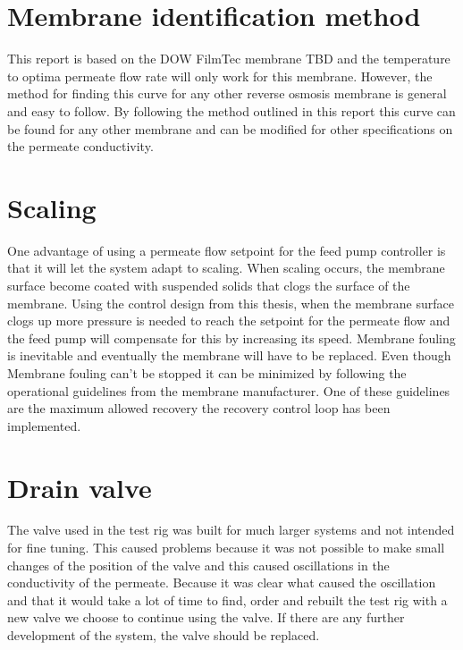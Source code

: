 \section{Membrane identification method}
This report is based on the DOW FilmTec membrane TBD and the temperature to optima permeate flow rate will only work for this membrane. However, the method for finding this curve for any other reverse osmosis membrane is general and easy to follow. By following the method outlined in this report this curve can be found for any other membrane and can be modified for other specifications on the permeate conductivity. 

\section{Scaling}
One advantage of using a permeate flow setpoint for the feed pump controller is that it will let the system adapt to scaling. When scaling occurs, the membrane surface become coated with suspended solids that clogs the surface of the membrane. Using the control design from this thesis, when the membrane surface clogs up more pressure is needed to reach the setpoint for the permeate flow and the feed pump will compensate for this by increasing its speed. Membrane fouling is inevitable and eventually the membrane will have to be replaced. Even though Membrane fouling can't be stopped it can be minimized by following the operational guidelines from the membrane manufacturer. One of these guidelines are the maximum allowed recovery the recovery control loop has been implemented. 

\section{Drain valve}
The valve used in the test rig was built for much larger systems and not intended for fine tuning. This caused problems because it was not possible to make small changes of the position of the valve and this caused oscillations in the conductivity of the permeate. Because it was clear what caused the oscillation and that it would take a lot of time to find, order and rebuilt the test rig with a new valve we choose to continue using the valve. If there are any further development of the system, the valve should be replaced.










